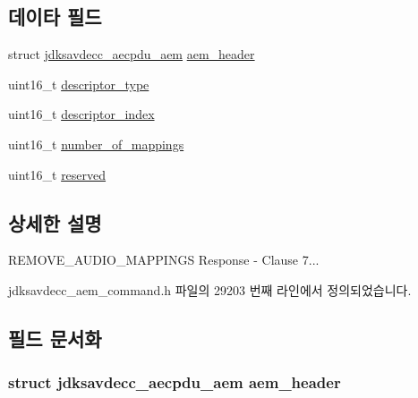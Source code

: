 \subsection*{데이타 필드}
\begin{DoxyCompactItemize}
\item 
struct \hyperlink{structjdksavdecc__aecpdu__aem}{jdksavdecc\+\_\+aecpdu\+\_\+aem} \hyperlink{structjdksavdecc__aem__command__remove__audio__mappings__response_ae1e77ccb75ff5021ad923221eab38294}{aem\+\_\+header}
\item 
uint16\+\_\+t \hyperlink{structjdksavdecc__aem__command__remove__audio__mappings__response_ab7c32b6c7131c13d4ea3b7ee2f09b78d}{descriptor\+\_\+type}
\item 
uint16\+\_\+t \hyperlink{structjdksavdecc__aem__command__remove__audio__mappings__response_a042bbc76d835b82d27c1932431ee38d4}{descriptor\+\_\+index}
\item 
uint16\+\_\+t \hyperlink{structjdksavdecc__aem__command__remove__audio__mappings__response_ac7db472c5622ef473d5d0a5c416d5531}{number\+\_\+of\+\_\+mappings}
\item 
uint16\+\_\+t \hyperlink{structjdksavdecc__aem__command__remove__audio__mappings__response_a5a6ed8c04a3db86066924b1a1bf4dad3}{reserved}
\end{DoxyCompactItemize}


\subsection{상세한 설명}
R\+E\+M\+O\+V\+E\+\_\+\+A\+U\+D\+I\+O\+\_\+\+M\+A\+P\+P\+I\+N\+GS Response -\/ Clause 7... 

jdksavdecc\+\_\+aem\+\_\+command.\+h 파일의 29203 번째 라인에서 정의되었습니다.



\subsection{필드 문서화}
\subsubsection[{\texorpdfstring{aem\+\_\+header}{aem_header}}]{\setlength{\rightskip}{0pt plus 5cm}struct {\bf jdksavdecc\+\_\+aecpdu\+\_\+aem} aem\+\_\+header}\hypertarget{structjdksavdecc__aem__command__remove__audio__mappings__response_ae1e77ccb75ff5021ad923221eab38294}{}\label{structjdksavdecc__aem__command__remove__audio__mappings__response_ae1e77ccb75ff5021ad923221eab38294}


